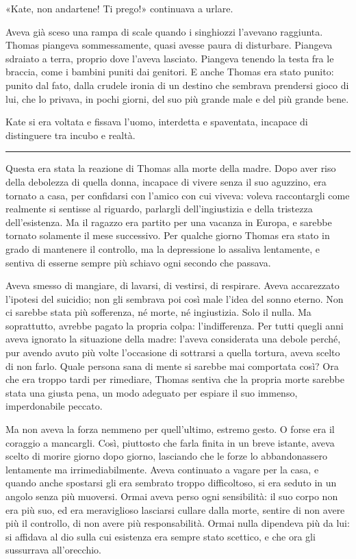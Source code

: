 \documentclass[a4paper,oneside,11pt]{memoir}
\begin{document}
«Kate, non andartene! Ti prego!» continuava a urlare.

Aveva già sceso una rampa di scale quando i singhiozzi l'avevano raggiunta.
Thomas piangeva sommessamente, quasi avesse paura di disturbare. Piangeva
sdraiato a terra, proprio dove l'aveva lasciato. Piangeva tenendo la testa fra
le braccia, come i bambini puniti dai genitori. E anche Thomas era stato punito:
punito dal fato, dalla crudele ironia di un destino che sembrava prendersi gioco
di lui, che lo privava, in pochi giorni, del suo più grande male e del più
grande bene.

Kate si era voltata e fissava l'uomo, interdetta e spaventata, incapace di
distinguere tra incubo e realtà.

\plainbreak{1}

Questa era stata la reazione di Thomas alla morte della madre. Dopo aver riso
della debolezza di quella donna, incapace di vivere senza il suo aguzzino, era
tornato a casa, per confidarsi con l'amico con cui viveva: voleva raccontargli
come realmente si sentisse al riguardo, parlargli dell'ingiustizia e della
tristezza dell'esistenza. Ma il ragazzo era partito per una vacanza in Europa, e
sarebbe tornato solamente il mese successivo. Per qualche giorno Thomas era
stato in grado di mantenere il controllo, ma la depressione lo assaliva
lentamente, e sentiva di esserne sempre più schiavo ogni secondo che passava.

Aveva smesso di mangiare, di lavarsi, di vestirsi, di respirare. Aveva
accarezzato l'ipotesi del suicidio; non gli sembrava poi così male l'idea del
sonno eterno. Non ci sarebbe stata più sofferenza, né morte, né ingiustizia.
Solo il nulla. Ma soprattutto, avrebbe pagato la propria colpa: l'indifferenza.
Per tutti quegli anni aveva ignorato la situazione della madre: l'aveva
considerata una debole perché, pur avendo avuto più volte l'occasione di
sottrarsi a quella tortura, aveva scelto di non farlo. Quale persona sana di
mente si sarebbe mai comportata così? Ora che era troppo tardi per rimediare,
Thomas sentiva che la propria morte sarebbe stata una giusta pena, un modo
adeguato per espiare il suo immenso, imperdonabile peccato.

Ma non aveva la forza nemmeno per quell'ultimo, estremo gesto. O forse era il
coraggio a mancargli. Così, piuttosto che farla finita in un breve istante,
aveva scelto di morire giorno dopo giorno, lasciando che le forze lo
abbandonassero lentamente ma irrimediabilmente. Aveva continuato a vagare per la
casa, e quando anche spostarsi gli era sembrato troppo difficoltoso, si era
seduto in un angolo senza più muoversi. Ormai aveva perso ogni sensibilità: il
suo corpo non era più suo, ed era meraviglioso lasciarsi cullare dalla morte,
sentire di non avere più il controllo, di non avere più responsabilità. Ormai
nulla dipendeva più da lui: si affidava al dio sulla cui esistenza era sempre
stato scettico, e che ora gli sussurrava all'orecchio.
\end{document}
